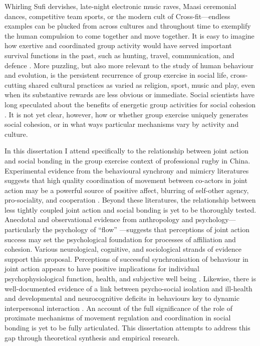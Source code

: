 Whirling Sufi dervishes, late-night electronic music raves, Maasi ceremonial dances, competitive team sports, or the modern cult of Cross-fit---endless examples can be plucked from across cultures and throughout time to exemplify the human compulsion to come together and move together.  It is easy to imagine how exertive and coordinated group activity would have served important survival functions in the past, such as hunting, travel, communication, and defence \citep{Sands2010}.  More puzzling, but also more relevant to the study of human behaviour and evolution, is the persistent recurrence of group exercise in social life, cross-cutting shared cultural practices as varied as religion, sport, music and play, even when its substantive rewards are less obvious or immediate.  Social scientists have long speculated about the benefits of energetic group activities for social cohesion \citep{Durkheim1965}. It is not yet clear, however, how or whether group exercise uniquely generates social cohesion, or in what ways particular mechanisms vary by activity and culture.

In this dissertation I attend specifically to the relationship between joint action and social bonding in the group exercise context of professional rugby in China.  Experimental evidence from the behavioural synchrony and mimicry literatures suggests that high quality coordination of movement between co-actors in joint action may be a powerful source of positive affect, blurring of self-other agency, pro-sociality, and cooperation \citep{Mogan2017}.  Beyond these literatures, the relationship between less tightly coupled joint action and social bonding is yet to be thoroughly tested. Anecdotal and observational evidence from anthropology and psychology---particularly the psychology of ``flow'' \citep{Csikszentmihalyi1992,Jackson1999}---suggests that perceptions of joint action success may set the psychological foundation for processes of affiliation and cohesion.
Various neurological, cognitive, and sociological strands of evidence support this proposal.  Perceptions of successful synchronisation of behaviour in joint action appears to have positive implications for individual psychophysiological function, health, and subjective well being \citep{Wheatley2012}.  Likewise, there is well-documented evidence of a link between psycho-social isolation and ill-health and developmental and neurocognitive deficits in behaviours key to dynamic interpersonal interaction \citep[e.g.][]{Blakemore2005,Baron-Cohen1991}. An account of the full significance of the role of proximate mechanisms of movement regulation and coordination in social bonding is yet to be fully articulated. This dissertation attempts to address this gap through theoretical synthesis and empirical research.

